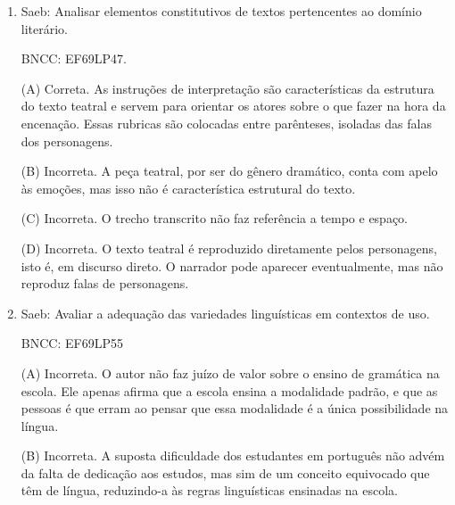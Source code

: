\begin{enumerate}
(B) Incorreta. A forma verbal expressa dúvida e hipótese. Porém, a notícia não faz juízo de valor sobre o fato,
já que essa não é uma das características desse gênero textual.

(C) Correta. O jornal traz uma notícia que não é nova ou inédita. Ele
está apenas relatando uma denúncia já feita antes numa reportagem por
outro veículo de informação. Por isso, usa a forma verbal de modo a evitar assumir a responsabilidade pela
afirmação e, ao mesmo tempo, atribuí-la a um terceiro.

(D) Incorreta. A reportagem citada na notícia qualificou a distorção dos
conceitos como algo ilegal, por deturpar as orientações dadas a
policiais num curso de formação, e a notícia manteve o tom de gravidade
da prática.

\item

Saeb: Analisar elementos constitutivos de textos pertencentes ao domínio
literário.

BNCC: EF69LP47.

(A) Correta. As instruções de interpretação são características da
estrutura do texto teatral e servem para orientar os atores sobre o que
fazer na hora da encenação. Essas rubricas são colocadas entre
parênteses, isoladas das falas dos personagens.

(B) Incorreta. A peça teatral, por ser do gênero dramático, conta com
apelo às emoções, mas isso não é característica estrutural do texto.

(C) Incorreta. O trecho transcrito não faz referência a tempo e espaço.

(D) Incorreta. O texto teatral é reproduzido diretamente pelos
personagens, isto é, em discurso direto. O narrador pode aparecer
eventualmente, mas não reproduz falas de personagens.

\item

Saeb: Avaliar a adequação das variedades linguísticas em contextos de
uso.

BNCC: EF69LP55

(A) Incorreta. O autor não faz juízo de valor sobre o ensino de
gramática na escola. Ele apenas afirma que a escola ensina a modalidade
padrão, e que as pessoas é que erram ao pensar que essa modalidade é a
única possibilidade na língua.

(B) Incorreta. A suposta dificuldade dos estudantes em português não
advém da falta de dedicação aos estudos, mas sim de um conceito
equivocado que têm de língua, reduzindo-a às regras linguísticas
ensinadas na escola.


\end{enumerate}
